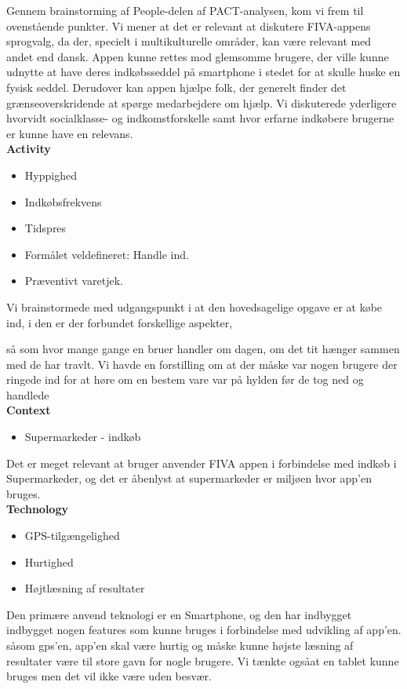 \documentclass[12pt]{article}
\begin{document}
\noindent Gennem brainstorming af People-delen af PACT-analysen, kom vi frem til ovenstående punkter. Vi mener at det er relevant at diskutere FIVA-appens sprogvalg, da der, specielt i multikulturelle områder, kan være relevant med andet end dansk. Appen kunne rettes mod glemsomme brugere, der ville kunne udnytte at have deres indkøbsseddel på smartphone i stedet for at skulle huske en fysisk seddel. Derudover kan appen hjælpe folk, der generelt finder det grænseoverskridende at spørge medarbejdere om hjælp. Vi diskuterede yderligere hvorvidt socialklasse- og indkomstforskelle samt hvor erfarne indkøbere brugerne er kunne have en relevans.\\

\noindent \textbf{Activity} 
\begin{itemize}
\item Hyppighed 
\item Indkøbsfrekvens  
\item Tidspres
\item Formålet veldefineret: Handle ind.
\item Præventivt varetjek. 
\end{itemize}



Vi brainstormede med udgangspunkt i at den hovedsagelige opgave er at købe ind, i den er der forbundet forskellige aspekter, 


så som hvor mange gange en bruer handler om dagen, om det tit hænger sammen med de har travlt. Vi havde en forstilling om at der måske var
nogen brugere der ringede ind for at høre om en bestem vare var på hylden før de tog ned og handlede\\

\noindent \textbf{Context}
\begin{itemize}
\item Supermarkeder - indkøb
\end{itemize}
Det er meget relevant at bruger anvender FIVA appen i forbindelse med indk\o b i Supermarkeder, og det er \aa benlyst at supermarkeder
er milj\o en hvor app'en bruges. \\

\noindent \textbf{Technology}
\begin{itemize} 
\item GPS-tilgængelighed
\item Hurtighed
\item Højtlæsning af resultater
\end{itemize}
Den prim\ae re anvend teknologi er en Smartphone, og den har indbygget indbygget nogen features som kunne bruges i forbindelse med udvikling
af app'en. s\aa  som gps'en, app'en skal v\ae re hurtig og m\aa ske kunne h\o jste l\ae sning af resultater v\ae re til store gavn for nogle 
brugere. Vi t\ae nkte ogs\aa  at en tablet kunne bruges men det vil ikke v\ae re uden besv\ae r.\\
   
\end{document}

